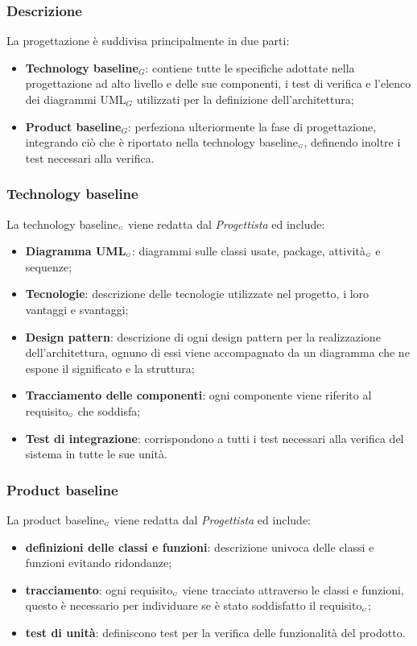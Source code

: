 \subsubsection{Descrizione}\label{ProcessiPrimariProgettazioneDescrizione}
La progettazione è suddivisa principalmente in due parti:
\begin{itemize}
	\item \textbf{Technology baseline$_G$}: contiene tutte le specifiche adottate nella progettazione ad alto livello e delle sue componenti, i test di verifica e l'elenco dei diagrammi UML$_G$ utilizzati per la definizione dell'architettura;
	\item \textbf{Product baseline$_G$}: perfeziona ulteriormente la fase di progettazione, integrando ciò che è riportato nella technology baseline$_{\scaleto{G}{3pt}}$, definendo inoltre i test necessari alla verifica.
\end{itemize}

\subsubsection{Technology baseline}\label{ProcessiPrimariProgettazioneTecnologyBaseline}
La technology baseline$_{\scaleto{G}{3pt}}$ viene redatta dal \textit{Progettista} ed include:
\begin{itemize}
	\item \textbf{Diagramma UML$_{\scaleto{G}{3pt}}$}: diagrammi sulle classi usate, package, attività$_{\scaleto{G}{3pt}}$ e sequenze;
	\item \textbf{Tecnologie}: descrizione delle tecnologie utilizzate nel progetto, i loro vantaggi e svantaggi;
	\item \textbf{Design pattern}: descrizione di ogni design pattern per la realizzazione dell'architettura, ognuno di essi viene accompagnato da un diagramma che ne espone il significato e la struttura; 
	\item \textbf{Tracciamento delle componenti}: ogni componente viene riferito al requisito$_{\scaleto{G}{3pt}}$ che soddisfa;
	\item \textbf{Test di integrazione}: corrispondono a tutti i test necessari alla verifica del sistema in tutte le sue unità.
\end{itemize}
\subsubsection{Product baseline}\label{ProcessiPrimariProgettazioneProductBaseline}
La product baseline$_{\scaleto{G}{3pt}}$ viene redatta dal \textit{Progettista} ed include:
\begin{itemize}
	\item \textbf{definizioni delle classi e funzioni}: descrizione univoca delle classi e funzioni evitando ridondanze;
	\item \textbf{tracciamento}: ogni requisito$_{\scaleto{G}{3pt}}$ viene tracciato attraverso le classi e funzioni, questo è necessario per individuare se è stato soddisfatto il requisito$_{\scaleto{G}{3pt}}$;
	\item \textbf{test di unità}: definiscono test per la verifica delle funzionalità del prodotto.
\end{itemize}
